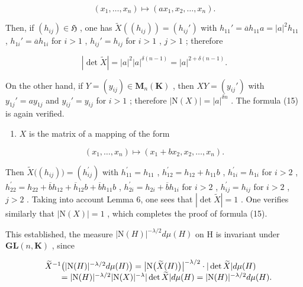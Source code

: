 \[
\left(x _ {1}, \dots , x _ {n}\right) \mapsto \left(a x _ {1}, x _ {2}, \dots , x _ {n}\right).
\]

Then, if \((h_{ij})\in \mathfrak{H}\) , one has \(\widetilde{X} ((h_{ij})) = (h_{ij}')\) with \(h_{11}' = \overline{a} h_{11}a = |a|^2 h_{11}\) , \(h_{1i}' = \overline{a} h_{1i}\) for \(i > 1\) , \(h_{ij}' = h_{ij}\) for \(i > 1\) , \(j > 1\) ; therefore

\[
| \det \widetilde {X} | = | a | ^ {2} | a | ^ {\delta (n - 1)} = | a | ^ {2 + \delta (n - 1)}.
\]

On the other hand, if \(Y = (y_{ij}) \in \mathbf{M}_n(\mathbf{K})\) , then \(XY = (y_{ij}')\) with \(y_{1j}' = ay_{1j}\) and \(y_{ij}' = y_{ij}\) for \(i > 1\) ; therefore \(|\mathrm{N}(X)| = |a|^{\delta n}\) . The formula (15) is again verified.

\begin{enumerate}
\def\labelenumi{\alph{enumi})}
\setcounter{enumi}{2}
\tightlist
\item
  \(X\) is the matrix of a mapping of the form
\end{enumerate}

\[
\left(x _ {1}, \dots , x _ {n}\right) \mapsto \left(x _ {1} + b x _ {2}, x _ {2}, \dots , x _ {n}\right).
\]

Then \(\widetilde{X}\big((h_{ij})\big) = (h_{ij}^{\prime})\) with \(h_{11}^{\prime} = h_{11}\) , \(h_{12}^{\prime} = h_{12} + h_{11}b\) , \(h_{1i}^{\prime} = h_{1i}\) for \(i > 2\) , \(h_{22}^{\prime} = h_{22} + \overline{b}h_{12} + \overline{h}_{12}b + \overline{b}h_{11}b\) , \(h_{2i}^{\prime} = h_{2i} + \overline{b}h_{1i}\) for \(i > 2\) , \(h_{ij}^{\prime} = h_{ij}\) for \(i > 2\) , \(j > 2\) . Taking into account Lemma 6, one sees that \(|\det \widetilde{X}| = 1\) . One verifies similarly that \(|\mathrm{N}(X)| = 1\) , which completes the proof of formula (15).

This established, the measure \(|\mathrm{N}(H)|^{-\lambda/2}d\mu(H)\) on H is invariant under \(\mathbf{GL}(n,\mathbf{K})\) , since

\[
\begin{array}{r l} & {\widetilde {X} ^ {- 1} \big (| \mathrm{N} (H) | ^ {- \lambda / 2} d \mu (H) \big) = \big | \mathrm{N} \big (\widetilde {X} (H) \big) \big | ^ {- \lambda / 2} \cdot | \det \widetilde {X} | d \mu (H)} \\ & {\qquad = | \mathrm{N} (H) | ^ {- \lambda / 2} | \mathrm{N} (X) | ^ {- \lambda} | \det \widetilde {X} | d \mu (H) = | \mathrm{N} (H) | ^ {- \lambda / 2} d \mu (H).} \end{array}
\]

